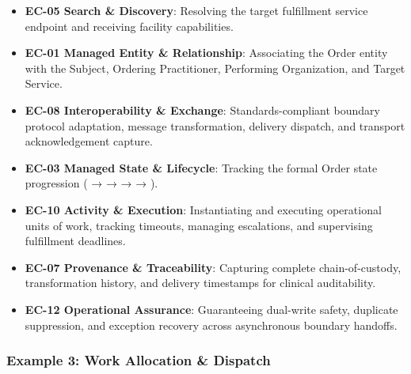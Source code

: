 \begin{itemize}
\begin{itemize}
\item
\textbf{EC-05 Search \& Discovery}: Resolving the target fulfillment service endpoint and receiving facility capabilities.



\item
\textbf{EC-01 Managed Entity \& Relationship}: Associating the Order entity with the Subject, Ordering Practitioner, Performing Organization, and Target Service.



\item
\textbf{EC-08 Interoperability \& Exchange}: Standards-compliant boundary protocol adaptation, message transformation, delivery dispatch, and transport acknowledgement capture.



\item
\textbf{EC-03 Managed State \& Lifecycle}: Tracking the formal Order state progression (\texttt{} → \texttt{} → \texttt{} → \texttt{} → \texttt{}).



\item
\textbf{EC-10 Activity \& Execution}: Instantiating and executing operational units of work, tracking timeouts, managing escalations, and supervising fulfillment deadlines.



\item
\textbf{EC-07 Provenance \& Traceability}: Capturing complete chain-of-custody, transformation history, and delivery timestamps for clinical auditability.



\item
\textbf{EC-12 Operational Assurance}: Guaranteeing dual-write safety, duplicate suppression, and exception recovery across asynchronous boundary handoffs.



\end{itemize}


\end{itemize}
\label{rad:tier-model:229}

\par\smallskip
{}\label{rad:tier-model:231}
\subsubsection*{Example 3: Work Allocation \& Dispatch}
\label{rad:tier-model:233}

